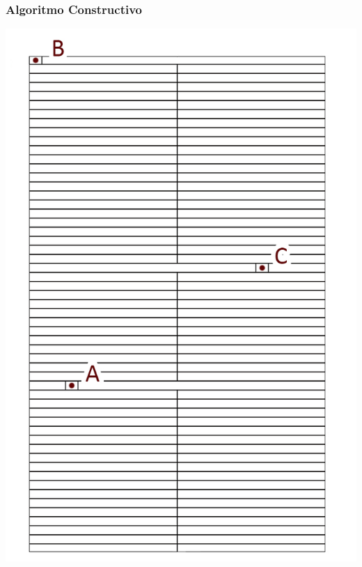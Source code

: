 \begin{frame}
    \frametitle{Algoritmo Constructivo}
    \endblock{}
		\begin{center}
    \includegraphics[height=0.8\textheight]{FIGURES/paso4}
		\end{center}
\end{frame}

